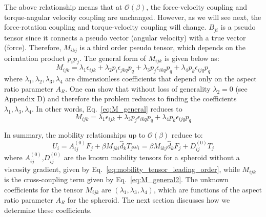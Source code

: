 \documentclass{jfm}
\begin{document}
The above relationship means that at $\mathcal{O}(\beta)$, the force-velocity coupling and torque-angular velocity coupling are unchanged. However, as we will see next, the force-rotation coupling and torque-velocity coupling will change.
$B_{ji}$ is a pseudo tensor since it connects a pseudo vector (angular velocity) with a true vector (force). Therefore, $M_{ikj}$ is a third order pseudo tensor, which depends on the orientation product $p_i p_j$. The general form of $M_{ijk}$ is given below as:
\begin{equation}
\label{eq:M_general}
    M_{ijk} =\lambda_1\epsilon_{ijk}+\lambda_2p_i\epsilon_{jkq}p_q+\lambda_3p_j\epsilon_{ikq}p_q+\lambda_4p_k\epsilon_{ijq}p_q
\end{equation}
where $\lambda_1, \lambda_2, \lambda_3, \lambda_4$ are dimensionless coefficients that depend only on the aspect ratio parameter $A_R$.  One can show that without loss of generality $\lambda_2=0$ (see Appendix D) and therefore the problem reduces to finding the coefficients $\lambda_1,\lambda_3,\lambda_4$. In other words, Eq.~\eqref{eq:M_general} reduces to 
\begin{equation}
\label{eq:M_general2}
     M_{ijk} =\lambda_1\epsilon_{ijk}+\lambda_3p_j\epsilon_{ikq}p_q+\lambda_4p_k\epsilon_{ijq}p_q
\end{equation}

In summary, the mobility relationships up to $\mathcal{O}(\beta)$ reduce to:
\begin{subequations} \label{eqn:mobility_tot}
\begin{equation} \label{eqn:trans_mobility}
    U_i = A_{ij}^{(0)}F_j+\beta M_{jki}\hat{d}_kT_j    
\end{equation}
\begin{equation} \label{eqn:rot_mobility}
    \omega_i =\beta M_{ikj}\hat{d}_kF_j+D_{ij}^{(0)}T_j
\end{equation}    
\end{subequations}
where $A_{ij}^{(0)}$,$D_{ij}^{(0)}$ are the known mobility tensors for a spheroid without a viscosity gradient, given by Eq.~\eqref{eq:mobility_tensor_leading_order}, while $M_{ijk}$ is the cross-coupling term given by Eq.~\eqref{eq:M_general2}.  The unknown coefficients for the tensor $M_{ijk}$ are $(\lambda_1,\lambda_3,\lambda_4)$, which are functions of the aspect ratio parameter $A_R$ for the spheroid. The next section discusses how we determine these coefficients.


\end{document}
